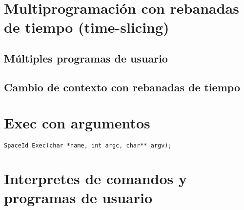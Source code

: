 \section{Multiprogramación con rebanadas de tiempo (time-slicing)}
\subsection*{Múltiples programas de usuario}
\subsection*{Cambio de contexto con rebanadas de tiempo}
\section{Exec con argumentos}
\begin{lstlisting}[style=C]
SpaceId Exec(char *name, int argc, char** argv);
\end{lstlisting}

\section{Interpretes de comandos y programas de usuario}